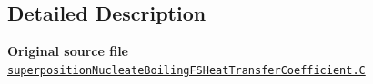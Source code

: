\subsection{Detailed Description}
{\bfseries Original source file} \href{../../../home/carlo/data/GeN-Foam/GeN-Foam_ffn/GeN-Foam/GeN-Foam/classes/thermalHydraulics/src/physicsModels/heatTransferModels/FSHeatTransferCoefficientModels/subModels/superpositionNucleateBoiling/superpositionNucleateBoilingFSHeatTransferCoefficient.C}{\tt superposition\+Nucleate\+Boiling\+F\+S\+Heat\+Transfer\+Coefficient.\+C} 